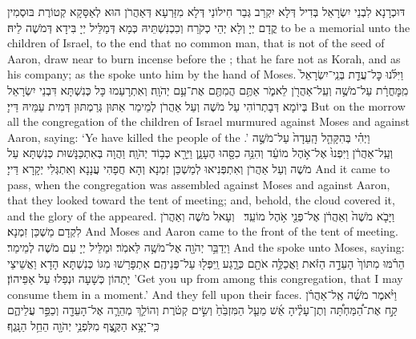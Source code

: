 {דּוּכְרָנָא לִבְנֵי יִשְׂרָאֵל בְּדִיל דְּלָא יִקְרַב גְּבַר חִילוֹנַי דְּלָא מִזַּרְעָא דְּאַהֲרֹן הוּא לְאַסָּקָא קְטוֹרֶת בּוּסְמִין קֳדָם יְיָ וְלָא יְהֵי כְקֹרַח וְכִכְנִשְׁתֵּיהּ כְּמָא דְּמַלֵּיל יְיָ בִּידָא דְּמֹשֶׁה לֵיהּ׃}
{to be a memorial unto the children of Israel, to the end that no common man, that is not of the seed of Aaron, draw near to burn incense before the \lord; that he fare not as Korah, and as his company; as the \lord\space spoke unto him by the hand of Moses.}{}
{וַיִּלֹּ֜נוּ כׇּל־עֲדַ֤ת בְּנֵֽי־יִשְׂרָאֵל֙ מִֽמׇּחֳרָ֔ת עַל־מֹשֶׁ֥ה וְעַֽל־אַהֲרֹ֖ן לֵאמֹ֑ר אַתֶּ֥ם הֲמִתֶּ֖ם אֶת־עַ֥ם יְהֹוָֽה׃}
{וְאִתְרָעַמוּ כָּל כְּנִשְׁתָּא דִּבְנֵי יִשְׂרָאֵל בְּיוֹמָא דְּבָתְרוֹהִי עַל מֹשֶׁה וְעַל אַהֲרֹן לְמֵימַר אַתּוּן גְּרַמְתּוּן דְּמִית עַמֵּיהּ דַּייָ׃}
{But on the morrow all the congregation of the children of Israel murmured against Moses and against Aaron, saying: ‘Ye have killed the people of the \lord.’}{}
{וַיְהִ֗י בְּהִקָּהֵ֤ל הָֽעֵדָה֙ עַל־מֹשֶׁ֣ה וְעַֽל־אַהֲרֹ֔ן וַיִּפְנוּ֙ אֶל־אֹ֣הֶל מוֹעֵ֔ד וְהִנֵּ֥ה כִסָּ֖הוּ הֶעָנָ֑ן וַיֵּרָ֖א כְּב֥וֹד יְהֹוָֽה׃}
{וַהֲוָה בְּאִתְכַּנָּשׁוּת כְּנִשְׁתָּא עַל מֹשֶׁה וְעַל אַהֲרֹן וְאִתְפְּנִיאוּ לְמַשְׁכַּן זִמְנָא וְהָא חֲפָהִי עֲנָנָא וְאִתְגְּלִי יְקָרָא דַּייָ׃}
{And it came to pass, when the congregation was assembled against Moses and against Aaron, that they looked toward the tent of meeting; and, behold, the cloud covered it, and the glory of the \lord\space appeared.}{}
{וַיָּבֹ֤א מֹשֶׁה֙ וְאַהֲרֹ֔ן אֶל־פְּנֵ֖י אֹ֥הֶל מוֹעֵֽד׃ \setuma }
{וְעָאל מֹשֶׁה וְאַהֲרֹן לִקְדָם מַשְׁכַּן זִמְנָא׃}
{And Moses and Aaron came to the front of the tent of meeting.}{}
{וַיְדַבֵּ֥ר יְהֹוָ֖ה אֶל־מֹשֶׁ֥ה לֵּאמֹֽר׃}
{וּמַלֵּיל יְיָ עִם מֹשֶׁה לְמֵימַר׃}
{And the \lord\space spoke unto Moses, saying:}{}
{הֵרֹ֗מּוּ מִתּוֹךְ֙ הָעֵדָ֣ה הַזֹּ֔את וַאֲכַלֶּ֥ה אֹתָ֖ם כְּרָ֑גַע וַֽיִּפְּל֖וּ עַל־פְּנֵיהֶֽם׃}
{אִתְפָּרַשׁוּ מִגּוֹ כְּנִשְׁתָּא הָדָא וַאֲשֵׁיצֵי יָתְהוֹן כְּשָׁעָה וּנְפַלוּ עַל אַפֵּיהוֹן׃}
{’Get you up from among this congregation, that I may consume them in a moment.’ And they fell upon their faces.}{}
{וַיֹּ֨אמֶר מֹשֶׁ֜ה אֶֽל־אַהֲרֹ֗ן קַ֣ח אֶת־הַ֠מַּחְתָּ֠ה וְתֶן־עָלֶ֨יהָ אֵ֜שׁ מֵעַ֤ל הַמִּזְבֵּ֙חַ֙ וְשִׂ֣ים קְטֹ֔רֶת וְהוֹלֵ֧ךְ מְהֵרָ֛ה אֶל־הָעֵדָ֖ה וְכַפֵּ֣ר עֲלֵיהֶ֑ם כִּֽי־יָצָ֥א הַקֶּ֛צֶף מִלִּפְנֵ֥י יְהֹוָ֖ה הֵחֵ֥ל הַנָּֽגֶף׃
}
